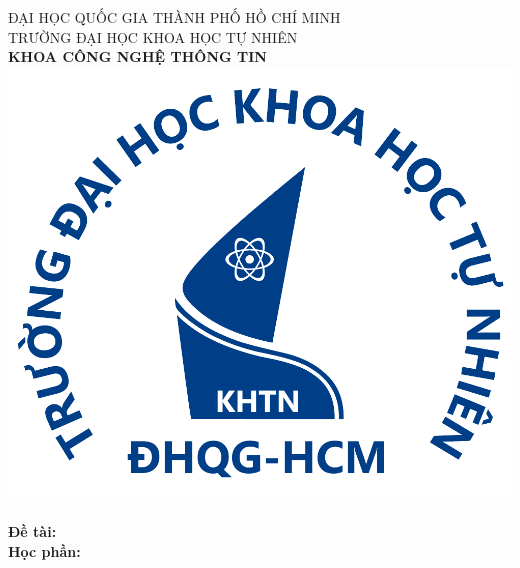 \begin{titlepage}
\newcommand{\HRule}{\rule{\linewidth}{0.5mm}}


\centering


\small{
\textsc{ĐẠI HỌC QUỐC GIA THÀNH PHỐ HỒ CHÍ MINH}\\
\textsc{TRƯỜNG ĐẠI HỌC KHOA HỌC TỰ NHIÊN}\\
\textsc{\textbf{KHOA CÔNG NGHỆ THÔNG TIN}}\\[1.25cm]
}
\includegraphics[scale=.1]{img/Logo-TA.png}\\[0.75cm] 


{ 
\Large{\bfseries\MakeUppercase{\reporttitle}}\\[0.5cm]
\large{\bfseries{Đề tài: \reportname}}
}\\[0.4cm]

\textbf{\large Học phần: \coursename}\\[0.5cm]

\\[2cm]


\end{titlepage}
